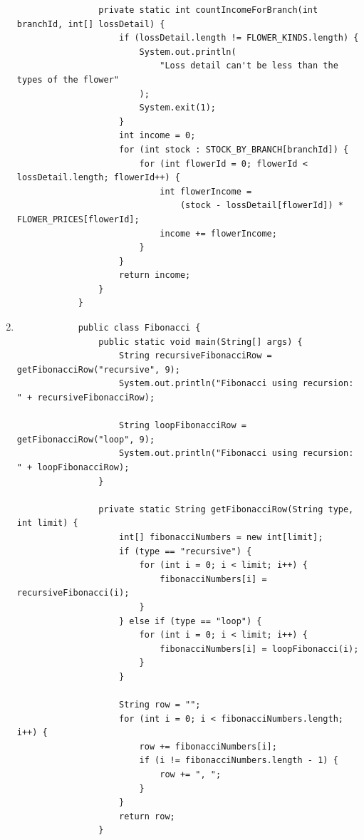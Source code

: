 \documentclass[12pt,titlepage]{article}
\begin{document}
\begin{enumerate}
{\begin{verbatim}
                private static int countIncomeForBranch(int branchId, int[] lossDetail) {
                    if (lossDetail.length != FLOWER_KINDS.length) {
                        System.out.println(
                            "Loss detail can't be less than the types of the flower"
                        );
                        System.exit(1);
                    }
                    int income = 0;
                    for (int stock : STOCK_BY_BRANCH[branchId]) {
                        for (int flowerId = 0; flowerId < lossDetail.length; flowerId++) {
                            int flowerIncome = 
                                (stock - lossDetail[flowerId]) * FLOWER_PRICES[flowerId];
                            income += flowerIncome;
                        }
                    }
                    return income;
                }
            }
        \end{verbatim}
    }
    \item {
        \begin{verbatim}
            public class Fibonacci {
                public static void main(String[] args) {
                    String recursiveFibonacciRow = getFibonacciRow("recursive", 9);
                    System.out.println("Fibonacci using recursion: " + recursiveFibonacciRow);

                    String loopFibonacciRow = getFibonacciRow("loop", 9);
                    System.out.println("Fibonacci using recursion: " + loopFibonacciRow);
                }

                private static String getFibonacciRow(String type, int limit) {
                    int[] fibonacciNumbers = new int[limit];
                    if (type == "recursive") {
                        for (int i = 0; i < limit; i++) {
                            fibonacciNumbers[i] = recursiveFibonacci(i);
                        }
                    } else if (type == "loop") {
                        for (int i = 0; i < limit; i++) {
                            fibonacciNumbers[i] = loopFibonacci(i);
                        }
                    }

                    String row = "";
                    for (int i = 0; i < fibonacciNumbers.length; i++) {
                        row += fibonacciNumbers[i];
                        if (i != fibonacciNumbers.length - 1) {
                            row += ", ";
                        }
                    }
                    return row;
                }


\end{verbatim}}
\end{enumerate}
\end{document}

